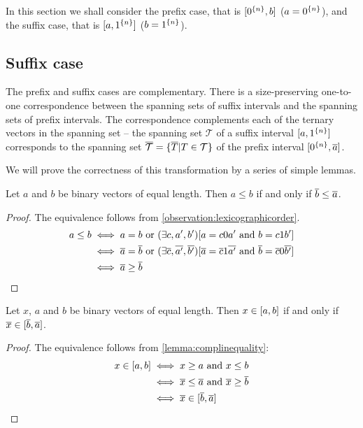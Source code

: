 In this section we shall consider the prefix case,
that is $[0^{\{n\}}, b]$ ($a = 0^{\{n\}}$),
and the suffix case,
that is $[a, 1^{\{n\}}]$ ($b = 1^{\{n\}}$).

\subsection{Suffix case}
\label{sec:suffix}


The prefix and suffix cases are complementary.
There is a size-preserving
one-to-one
correspondence between
the spanning sets of suffix intervals
and the spanning sets
of prefix intervals.
The correspondence complements each of the ternary vectors in the spanning set
-- the spanning set $\mathcal{T}$
of a suffix interval $[a, 1^{\{n\}}]$
corresponds to the spanning set
$\overline{\mathcal{T}}
= \{\overline{T} | T \in \mathcal{T}\}$
of the prefix interval
$[0^{\{n\}}, \overline{a}]$.

We will prove the correctness of this transformation
by a series of simple lemmas.

\begin{lemma}
\label{lemma:complinequality}
Let $a$ and $b$ be binary vectors of equal length.
Then $a \leq b$ if and only if $\overline{b} \leq \overline{a}$.
\end{lemma}

\begin{proof}
The equivalence follows from \cref{observation:lexicographicorder}.
\begin{align*}
a \leq b &\iff a=b \text{ or } (\exists c, a', b') [a=c0a' \text{ and } b=c1b'] \\
&\iff \overline{a}=\overline{b} \text{ or } (\exists \overline{c}, \overline{a'}, \overline{b'}) [\overline{a}=\overline{c}1\overline{a'} \text{ and } \overline{b}=\overline{c}0\overline{b'}] \\
&\iff \overline{a} \geq \overline{b}
\end{align*}
\end{proof}

\begin{lemma}
\label{lemma:complinterval}
Let $x$, $a$ and $b$ be binary vectors of equal length.
Then $x \in [a, b]$ if and only if $\overline{x} \in [\overline{b}, \overline{a}]$.
\end{lemma}

\begin{proof}
The equivalence follows from \cref{lemma:complinequality}:
\begin{align*}
x \in [a, b] &\iff x \geq a \text{ and } x \leq b \\
&\iff \overline{x} \leq \overline{a} \text{ and } \overline{x} \geq \overline{b} \\
&\iff \overline{x} \in [\overline{b}, \overline{a}]
\end{align*}
\end{proof}

